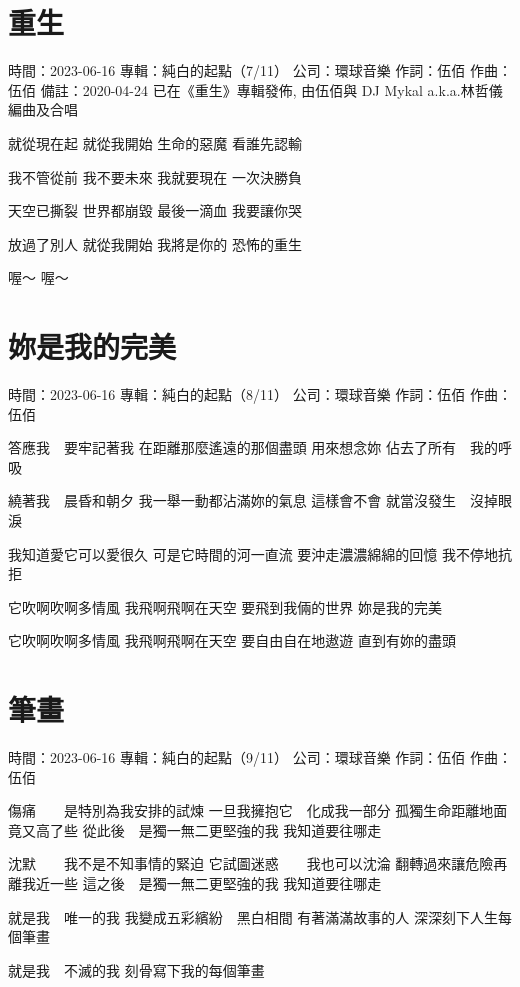 \documentclass[UTF8,a4paper,oneside,twocolumn,12pt]{ctexbook}
\newcommand{\infopair}[2]{\textbullet #1：#2}
\newcommand{\zc}[1][伍佰]{\infopair{作詞}{#1}}
\newcommand{\zq}[1][伍佰]{\infopair{作曲}{#1}}
\newcommand{\zj}[1]{\infopair{專輯}{#1}}
\newcommand{\sj}[1]{\infopair{時間}{#1}}
\newcommand{\bz}[1]{\infopair{備註}{#1}}
\newcommand{\gs}[1]{\infopair{公司}{#1}}
\newenvironment{info}{\begin{flushleft}\kaishu
	}
	{\end{flushleft}\normalsize\yahei\par}
\newenvironment{lyric}{
	}
{}
\begin{document}
\section{重生}
\begin{info}
	\sj{2023-06-16}
	\zj{純白的起點（7/11）}
	\gs{環球音樂}
	\zc
	\zq
	\bz{2020-04-24 已在《重生》專輯發佈, 由伍佰與 DJ Mykal a.k.a.林哲儀編曲及合唱}
\end{info}
\begin{lyric}
	就從現在起 就從我開始
	生命的惡魔 看誰先認輸

	我不管從前 我不要未來
	我就要現在 一次決勝負

	天空已撕裂 世界都崩毀
	最後一滴血 我要讓你哭

	放過了別人 就從我開始
	我將是你的 恐怖的重生

	喔～
	喔～
\end{lyric}

\section{妳是我的完美}
\begin{info}
	\sj{2023-06-16}
	\zj{純白的起點（8/11）}
	\gs{環球音樂}
	\zc
	\zq
\end{info}
\begin{lyric}
	答應我　要牢記著我
	在距離那麼遙遠的那個盡頭
	用來想念妳
	佔去了所有　我的呼吸

	繞著我　晨昏和朝夕
	我一舉一動都沾滿妳的氣息
	這樣會不會
	就當沒發生　沒掉眼淚

	我知道愛它可以愛很久
	可是它時間的河一直流
	要沖走濃濃綿綿的回憶
	我不停地抗拒

	它吹啊吹啊多情風
	我飛啊飛啊在天空
	要飛到我倆的世界
	妳是我的完美

	它吹啊吹啊多情風
	我飛啊飛啊在天空
	要自由自在地遨遊
	直到有妳的盡頭
\end{lyric}

\section{筆畫}
\begin{info}
	\sj{2023-06-16}
	\zj{純白的起點（9/11）}
	\gs{環球音樂}
	\zc
	\zq
\end{info}
\begin{lyric}
	傷痛　　是特別為我安排的試煉
	一旦我擁抱它　化成我一部分
	孤獨生命距離地面竟又高了些
	從此後　是獨一無二更堅強的我
	我知道要往哪走

	沈默　　我不是不知事情的緊迫
	它試圖迷惑　　我也可以沈淪
	翻轉過來讓危險再離我近一些
	這之後　是獨一無二更堅強的我
	我知道要往哪走

	就是我　唯一的我
	我變成五彩繽紛　黑白相間
	有著滿滿故事的人
	深深刻下人生每個筆畫

	就是我　不滅的我
	刻骨寫下我的每個筆畫
\end{lyric}
\end{document}
